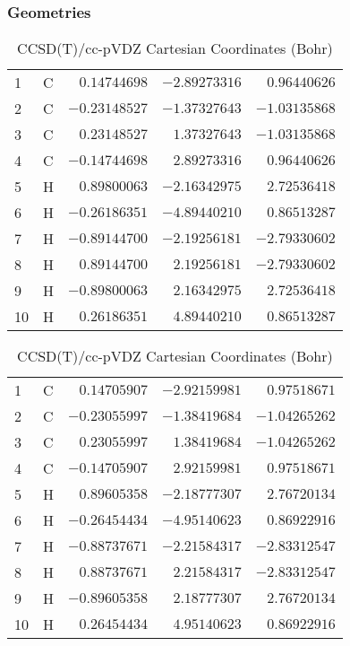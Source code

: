\documentclass[10pt,oneside]{article}
\begin{document}
\clearpage

\subsection{}

\begin{table}[h!]
\subsubsection*{Geometries}
\begin{multicols}{2}
\centering
\caption{CCSD(T)/cc-pVTZ Cartesian Coordinates (Bohr)}
\begin{tabular}{llrrr}
\toprule
1  & C  & $ 0.14744698$ & $-2.89273316$ & $ 0.96440626$ \\
2  & C  & $-0.23148527$ & $-1.37327643$ & $-1.03135868$ \\
3  & C  & $ 0.23148527$ & $ 1.37327643$ & $-1.03135868$ \\
4  & C  & $-0.14744698$ & $ 2.89273316$ & $ 0.96440626$ \\
5  & H  & $ 0.89800063$ & $-2.16342975$ & $ 2.72536418$ \\
6  & H  & $-0.26186351$ & $-4.89440210$ & $ 0.86513287$ \\
7  & H  & $-0.89144700$ & $-2.19256181$ & $-2.79330602$ \\
8  & H  & $ 0.89144700$ & $ 2.19256181$ & $-2.79330602$ \\
9  & H  & $-0.89800063$ & $ 2.16342975$ & $ 2.72536418$ \\
10 & H  & $ 0.26186351$ & $ 4.89440210$ & $ 0.86513287$ \\
\bottomrule
\end{tabular}
\caption{CCSD(T)/cc-pVDZ Cartesian Coordinates (Bohr)}
\begin{tabular}{llrrr}
\toprule
1  & C  & $ 0.14705907$ & $-2.92159981$ & $ 0.97518671$ \\
2  & C  & $-0.23055997$ & $-1.38419684$ & $-1.04265262$ \\
3  & C  & $ 0.23055997$ & $ 1.38419684$ & $-1.04265262$ \\
4  & C  & $-0.14705907$ & $ 2.92159981$ & $ 0.97518671$ \\
5  & H  & $ 0.89605358$ & $-2.18777307$ & $ 2.76720134$ \\
6  & H  & $-0.26454434$ & $-4.95140623$ & $ 0.86922916$ \\
7  & H  & $-0.88737671$ & $-2.21584317$ & $-2.83312547$ \\
8  & H  & $ 0.88737671$ & $ 2.21584317$ & $-2.83312547$ \\
9  & H  & $-0.89605358$ & $ 2.18777307$ & $ 2.76720134$ \\
10 & H  & $ 0.26454434$ & $ 4.95140623$ & $ 0.86922916$ \\
\bottomrule
\end{tabular}
\end{multicols}
\end{table}
\end{document}
